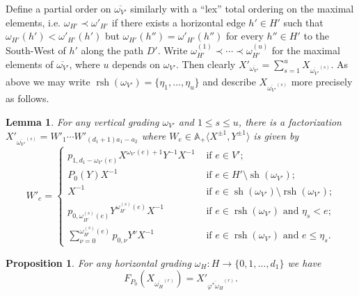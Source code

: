 \documentclass{amsart}
\newtheorem{lemma}[theorem]{Lemma}
\newtheorem{proposition}[theorem]{Proposition}
\renewcommand{\AA}{\mathbb{A}}
\newcommand{\rsh}{\operatorname{rsh}}
\newcommand{\sh}{\operatorname{sh}}
\begin{document}
Define a partial order on $\overline{\omega_{V'}}$ similarly with a ``lex'' total ordering on the maximal elements, i.e. $\omega_{H'}\prec\omega'_{H'}$ if there exists a horizontal edge $h'\in H'$ such that $\omega_{H'}(h')<\omega'_{H'}(h')$ but $\omega_{H'}(h'')=\omega'_{H'}(h'')$ for every $h''\in H'$ to the South-West of $h'$ along the path $D'$.  Write $\omega_{H'}^{(1)}\prec\cdots\prec\omega_{H'}^{(u)}$ for the maximal elements of $\overline{\omega_{V'}}$, where $u$ depends on $\omega_{V'}$.  Then clearly $X'_{\overline{\omega_{V'}}}=\sum\limits_{s=1}^u X_{\overline{\omega_{V'}}^{(s)}}$.  As above we may write $\rsh(\omega_{V'})=\{\eta_1,\ldots,\eta_u\}$ and describe $X_{\overline{\omega_{V'}}^{(s)}}$ more precisely as follows.
\begin{lemma}
 For any vertical grading $\omega_{V'}$ and $1\le s\le u$, there is a factorization $X'_{\overline{\omega_{V'}}^{(s)}}=W'_1\cdots W'_{(d_1+1)a_1-a_2}$ where $W_e\in\AA_+\langle X^{\pm1},Y^{\pm1}\rangle$ is given by
 \[W'_e=\begin{cases}p_{1,d_1-\omega_{V'}(e)}X^{\omega_{V'}(e)+1}Y^{-1}X^{-1} & \text{ if $e\in V'$;}\\ P_0(Y)X^{-1} & \text{ if $e\in H'\setminus\sh(\omega_{V'});$}\\ X^{-1} & \text{ if $e\in\sh(\omega_{V'})\setminus\rsh(\omega_{V'})$;}\\ p_{0,\omega_{H'}^{(s)}(e)}Y^{\omega_{H'}^{(s)}(e)}X^{-1} & \text{ if $e\in\rsh(\omega_{V'})$ and $\eta_s<e$;}\\ \sum\limits_{\nu=0}^{\omega_{H'}^{(s)}(e)}p_{0,\nu} Y^\nu X^{-1} & \text{ if $e\in\rsh(\omega_{V'})$ and $e\le\eta_s$.}\end{cases}\]
\end{lemma}
\begin{proposition}
 For any horizontal grading $\omega_H:H\to\{0,1,\ldots,d_1\}$ we have
\[F_{P_0}(X_{\overline{\omega_H}^{(r)}})=X'_{\overline{\varphi^*\omega_H}^{(r)}}.\]
\end{proposition}
\end{document}
